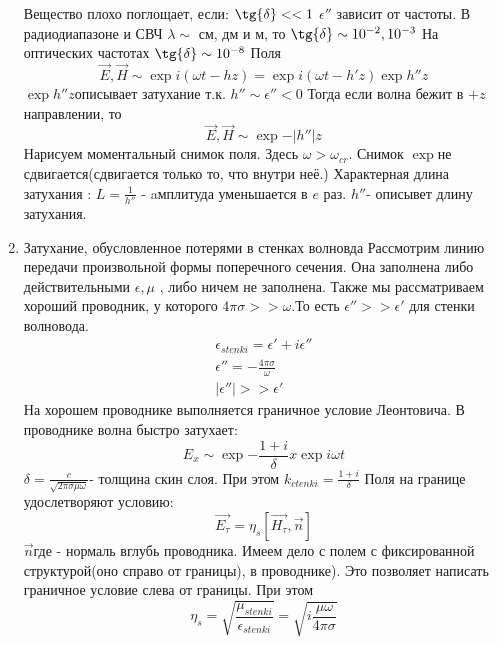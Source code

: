\begin{enumerate}
	Вещество плохо поглощает, если: $\tg{\delta} << 1$
	$\epsilon''$ зависит от частоты.
	В радиодиапазоне и СВЧ $\lambda \sim$ см, дм и м, то $\tg{\delta} \sim 10^{-2}, 10^{-3}$
	На оптических частотах $\tg{\delta} \sim 10^{-8}$ 
	Поля
	\begin{equation}
		\vec{E}, \vec{H} \sim \exp{i(\omega t - h z)} = \exp{i(\omega t - h' z)} \exp{h'' z}
	\end{equation}
	$\exp{h'' z}$описывает затухание т.к.  $h'' \sim \epsilon'' < 0$
	Тогда если волна бежит в $+z$ направлении, то 
	\begin{equation}
		\vec{E}, \vec{H} \sim \exp{-|h''| z}
	\end{equation}
	Нарисуем моментальный снимок поля. Здесь $\omega > \omega_{cr}$.
	Снимок
	$\exp$не сдвигается(сдвигается только то, что внутри неё.)
	Характерная длина затухания : $L = \frac{1}{h''}$ - aмплитуда уменьшается в $e$ раз.
	$h''$- описывет длину затухания.
	\item{Затухание, обусловленное потерями в стенках волновда}
	Рассмотрим линию передачи произвольной формы поперечного сечения. Она заполнена либо действительными $\epsilon, \mu$ , либо ничем не заполнена. Также мы рассматриваем хороший проводник, у которого $4 \pi \sigma >> \omega$.То есть $\epsilon'' >> \epsilon'$ для стенки волновода.
	\begin{gather}
		\epsilon_{stenki} = \epsilon' + i \epsilon''\\
		\epsilon'' = - \frac{4 \pi \sigma}{\omega}\\
		|\epsilon''| >> \epsilon'
	\end{gather}
	На хорошем проводнике выполняется граничное условие Леонтовича.
	В проводнике волна быстро затухает:
	\begin{equation}
		E_x \sim \exp{- \frac{1+i}{\delta} x} \exp{ i \omega t}
	\end{equation}
	$\delta = \frac{c}{\sqrt{2 \pi \sigma \mu \omega}}$- толщина скин слоя.
	При этом $k_{ctenki} = \frac{1+i}{\delta}$
	Поля на границе удослетворяют условию:
	\begin{equation}
		\vec{E_{\tau}} = \eta_s [\vec{H_{\tau}}, \vec{n}]
	\end{equation}
	$\vec{n}$где  - нормаль вглубь проводника.
	Имеем дело с полем с фиксированной структурой(оно справо от границы), в проводнике). Это позволяет написать граничное условие слева от границы.
	При этом
	\begin{equation}
		\eta_s = \sqrt{\frac{\mu_{stenki}}{\epsilon_{stenki}}} = \sqrt{i \frac{\mu \omega}{4 \pi \sigma}}

\end{equation}
\end{enumerate}
